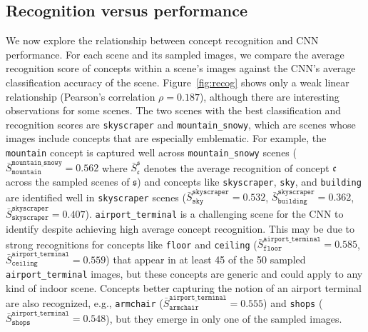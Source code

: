 \documentclass{article}
\begin{document}
\subsection{Recognition versus performance}
\label{subsec:performance_section}
We now explore the relationship between concept recognition and CNN performance. 
For each scene and its sampled images, we compare the average recognition score of concepts within 
a scene's images against the CNN's average classification accuracy of the scene. 
Figure~\ref{fig:recog} shows only a weak linear relationship (Pearson's correlation $\rho = 0.187$), although 
there are interesting observations for some scenes. The two scenes with the best classification
and recognition scores are \texttt{skyscraper} and \texttt{mountain\_snowy}, which are scenes whose
images include concepts that are especially emblematic.
For example, the \texttt{mountain} concept is captured well across 
\texttt{mountain\_snowy} scenes ($\bar{S}^\mathtt{mountain\_snowy}_{\mathtt{mountain}} = 0.562$
where $\bar{S}^\mathfrak{s}_\mathfrak{c}$ denotes the average recognition of concept $\mathfrak{c}$ across
the sampled scenes of $\mathfrak{s}$) 
and concepts like \texttt{skyscraper}, \texttt{sky}, and \texttt{building} are identified well in 
\texttt{skyscraper} scenes ($\bar{S}^{\texttt{skyscraper}}_{\mathtt{sky}} = 0.532$, $\bar{S}^\texttt{skyscraper}_{\mathtt{building}}=0.362$, $\bar{S}^\texttt{skyscraper}_{\mathtt{skyscraper}}=0.407$).
\texttt{airport\_terminal} is a challenging scene for the CNN to identify despite achieving
high average concept recognition. This may be due to strong recognitions for concepts like 
\texttt{floor} and \texttt{ceiling} ($\bar{S}^\texttt{airport\_terminal}_{\mathtt{floor}}=0.585$, 
$\bar{S}^\texttt{airport\_terminal}_{\mathtt{ceiling}}=0.559$) that appear in at least 45 of the 50 sampled \texttt{airport\_terminal} images, but these concepts are generic and could apply to any kind of indoor scene. Concepts better capturing the notion of an airport terminal are also recognized, e.g., \texttt{armchair} ($\bar{S}^\texttt{airport\_terminal}_{\mathtt{armchair}} = 0.555$) and \texttt{shops} ($\bar{S}^\texttt{airport\_terminal}_{\mathtt{shops}} = 0.548$), but they emerge in only one of the sampled images.  
\end{document}
